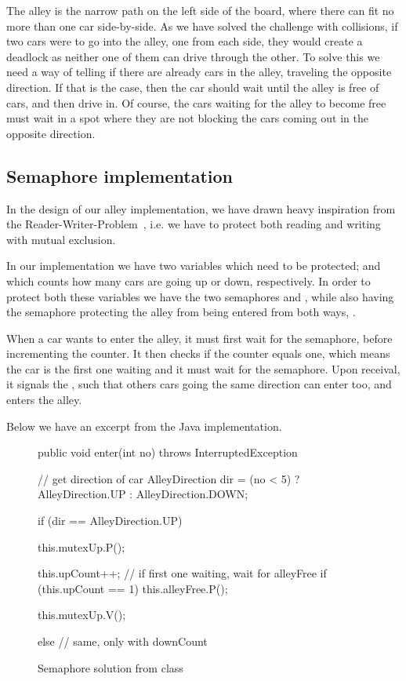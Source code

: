 
The alley is the narrow path on the left side of the board, where
there can fit no more than one car side-by-side. As we have solved the
challenge with collisions, if two cars were to go into the alley, one
from each side, they would create a deadlock as neither one of them
can drive through the other. To solve this we need a way of telling if
there are already cars in the alley, traveling the opposite
direction. If that is the case, then the car should wait until the
alley is free of cars, and then drive in. Of course, the cars waiting
for the alley to become free must wait in a spot where they are not
blocking the cars coming out in the opposite direction.


\subsection{Semaphore implementation}
\label{sub:all-sema}
In the design of our alley implementation, we have drawn heavy inspiration from the
Reader-Writer-Problem~\cite[p. 170]{andrews}, i.e. we have to protect
both reading and writing with mutual exclusion.

In our implementation we have two variables which need to be
protected;  and  which counts how many
cars are going up or down, respectively. In order to protect both
these variables we have the two semaphores  and
, while also having the semaphore protecting the alley
from being entered from both ways, .

When a car wants to enter the alley, it must first wait for the
 semaphore, before incrementing the counter. It then checks if the counter
equals one, which means the car is the first one waiting and it must wait
for the  semaphore. Upon receival, it signals the
, such that others cars going the same direction can enter too, and enters the alley.

Below we have an excerpt from the Java implementation.

\begin{figure}[H]
\label{lst:all-sem}
  \begin{java}
public void enter(int no) throws InterruptedException {
  // get direction of car
  AlleyDirection dir = (no < 5) ? AlleyDirection.UP : AlleyDirection.DOWN;

  if (dir == AlleyDirection.UP) {
    this.mutexUp.P();

    this.upCount++;
    // if first one waiting, wait for alleyFree
    if (this.upCount == 1)
      this.alleyFree.P();

    this.mutexUp.V();

  } else {
    // same, only with downCount
  }
}
  \end{java}
  \caption{Semaphore solution from  class}
\end{figure}


